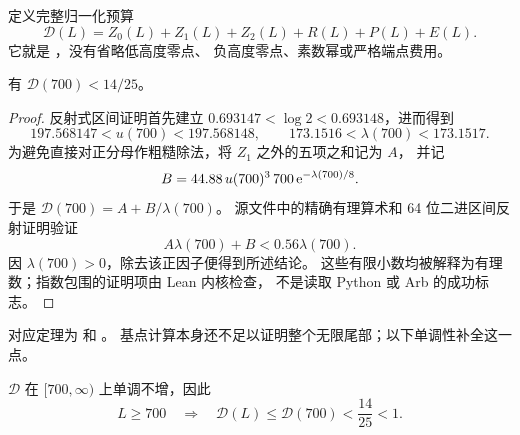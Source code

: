 定义完整归一化预算
\begin{equation}\label{tail:delta}
 \mathcal D(L)=Z_0(L)+Z_1(L)+Z_2(L)+R(L)+P(L)+E(L).
\end{equation}
它就是 ，没有省略低高度零点、
负高度零点、素数幂或严格端点费用。

\begin{lemma}[基点的内核数值界]\label{tail:base-certificate}
有 $\mathcal D(700)<14/25$。
\end{lemma}

\begin{proof}
反射式区间证明首先建立
$0.693147<\log2<0.693148$，进而得到
\[
 197.568147<u(700)<197.568148,\qquad
 173.1516<\lambda(700)<173.1517.
\]
为避免直接对正分母作粗糙除法，将 $Z_1$ 之外的五项之和记为 $A$，
并记
\[
 B=44.88\,u(700)^3\,700\,\mathrm e^{-\lambda(700)/8}.
\]
于是 $\mathcal D(700)=A+B/\lambda(700)$。
源文件中的精确有理算术和 64 位二进区间反射证明验证
\[
 A\lambda(700)+B<0.56\lambda(700).
\]
因 $\lambda(700)>0$，除去该正因子便得到所述结论。
这些有限小数均被解释为有理数；指数包围的证明项由 Lean 内核检查，
不是读取 Python 或 Arb 的成功标志。
\end{proof}

对应定理为  和
。
基点计算本身还不足以证明整个无限尾部；以下单调性补全这一点。

\begin{lemma}[连续单调性]\label{tail:monotone}
$\mathcal D$ 在 $[700,\infty)$ 上单调不增，因此
\begin{equation}\label{tail:global-budget}
 L\geq700\quad\Longrightarrow\quad
 \mathcal D(L)\leq\mathcal D(700)<\frac{14}{25}<1.
\end{equation}
\end{lemma}

